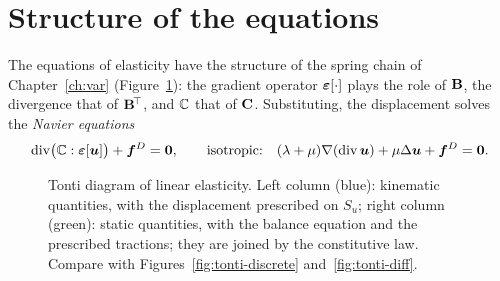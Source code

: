 \section{Structure of the equations}\label{sec:el-structure}
%
The equations of elasticity have the structure of the spring chain of
Chapter~\ref{ch:var} (Figure~\ref{fig:tonti-el}): the gradient operator
$\bm{\varepsilon}[\cdot]$ plays the role of $\mathbf{B}$, the divergence that of $\mathbf{B}^{\!\top}$,
and $\mathbb{C}$ that of $\mathbf{C}$. Substituting, the displacement solves the
\emph{Navier equations}
\[
  \operatorname{div}\bigl(\mathbb{C}:\bm{\varepsilon}[\bm{u}]\bigr)+\bm{f}^{D}=\bm{0},\qquad\text{isotropic:}\quad
  (\lambda+\mu)\nabla(\operatorname{div}\bm{u})+\mu\Delta\bm{u}+\bm{f}^{D}=\bm{0} .
\]
\begin{figure}[h]
\centering
{}
\caption{Tonti diagram of linear elasticity. Left column (blue): kinematic
quantities, with the displacement prescribed on $S_u$; right column (green):
static quantities, with the balance equation and the prescribed tractions;
they are joined by the constitutive law. Compare with
Figures~\ref{fig:tonti-discrete} and~\ref{fig:tonti-diff}.}
\label{fig:tonti-el}
\end{figure}

